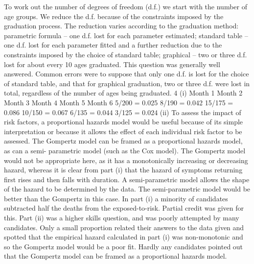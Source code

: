 \documentclass[a4paper,12pt]{article}
\begin{document}
To work out the number of degrees of freedom (d.f.) we start with the number of age groups.
We reduce the d.f. because of the constraints imposed by the graduation process.
The reduction varies according to the graduation method:
parametric formula – one d.f. lost for each parameter estimated;
standard table – one d.f. lost for each parameter fitted and a further reduction due to the constraints imposed by the choice of standard table;
graphical – two or three d.f. lost for about every 10 ages graduated.
This question was generally well answered. Common errors were to suppose that only one d.f. is lost for the choice of standard table, and that for graphical graduation, two or three
d.f. were lost in total, regardless of the number of ages being graduated.
4
(i) Month 1
Month 2
Month 3
Month 4
Month 5
Month 6
5/200 = 0.025
8/190 = 0.042
15/175 = 0.086
10/150 = 0.067
6/135 = 0.044
3/125 = 0.024
(ii) To assess the impact of risk factors, a proportional hazards model would be useful
because of its simple interpretation or because it allows the effect of each individual
risk factor to be assessed.
The Gompertz model can be framed as a proportional hazards model, as can a semi-
parametric model (such as the Cox model).
The Gompertz model would not be appropriate here, as it has a monotonically
increasing or decreasing hazard,
whereas it is clear from part (i) that the hazard of symptoms returning first rises and
then falls with duration.
A semi-parametric model allows the shape of the hazard to be determined by the data.
The semi-parametric model would be better than the Gompertz in this case.
In part (i) a minority of candidates subtracted half the deaths from the exposed-to-risk. Partial credit was given for this. Part (ii) was a higher skills question, and was poorly
attempted by many candidates. Only a small proportion related their answers to the data 
given and spotted that the empirical hazard calculated in part (i) was non-monotonic and so
the Gompertz model would be a poor fit. Hardly any candidates pointed out that the
Gompertz model can be framed as a proportional hazards model.
\end{document}
